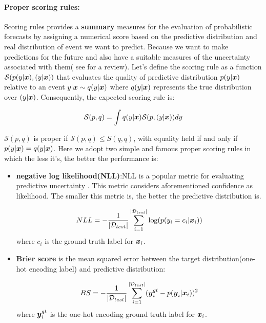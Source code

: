 \paragraph{Proper scoring rules:} 
Scoring rules provides a \textbf{summary} measures for the evaluation of probabilistic forecasts by assigning a numerical score based on the predictive distribution and real distribution of event we want to predict. Because we want to make predictions for the future and also have a suitable measures of the uncertainty associated with them(  see \cite{gneiting2007strictly} for a review). Let's define the scoring rule as a function $\mathcal S(p(y|\boldsymbol x), (y|\boldsymbol x))$ that evaluates the quality of predictive distribution $p(y|\boldsymbol x)$ relative to an event $y|\boldsymbol x \sim q(y|\boldsymbol x)$ where $q(y|\boldsymbol x)$ represents the true distribution over $(y|\boldsymbol x)$. Consequently, the expected scoring rule is:

\begin{equation}\label{scoring rule}
	\mathcal S(p, q) = \int q(y| \boldsymbol x) \mathcal S(p,(y|\boldsymbol x))dy
\end{equation}

$\mathcal S(p,q)$ is proper if $\mathcal S(p,q) \leq S(q,q)$, with equality held if and only if $p(y|\boldsymbol x) = q(y|\boldsymbol x)$. Here we adopt two simple and famous proper scoring rules in which the less it's, the better the performance is:
\begin{itemize}
	\item \textbf{negative log likelihood(NLL)}:NLL is a popular metric for evaluating predictive uncertainty	\cite{quinonero2005evaluating}. This metric considers aforementioned confidence as likelihood. The smaller this metric is, the better the predictive distribution is.
	
	\begin{equation} \label{nll}
		NLL = -\frac{1}{|\mathcal D_{test}|}\sum_{i=1}^{|\mathcal D_{test}|}\text{log}(p(y_i = c_i|\boldsymbol x_i))
	\end{equation}
	where $c_i$ is the ground truth label for $\boldsymbol x_i$.	
	\item \textbf{Brier score} is the mean squared error between the target distribution(one-hot encoding label) and predictive distribution:
	
	\begin{equation} \label{bs}
	BS = -\frac{1}{|\mathcal D_{test}|}\sum_{i=1}^{|\mathcal D_{test}|}(\boldsymbol y^{gt}_i - p(\boldsymbol y_i|\boldsymbol x_i))^2
	\end{equation}
	where $\boldsymbol y^{gt}_i$ is the one-hot encoding ground truth label for $\boldsymbol x_i$. 
	
\end{itemize}

